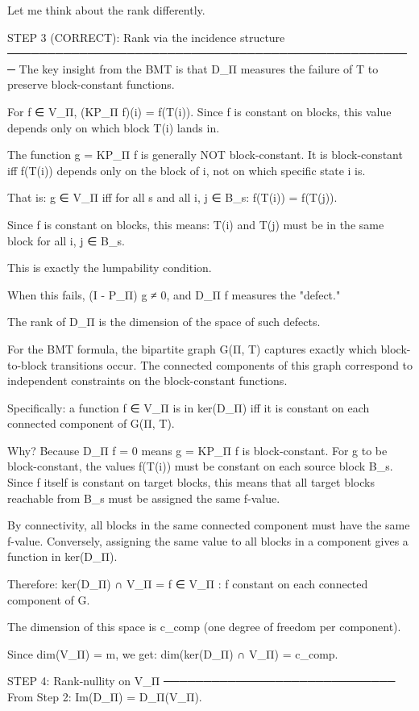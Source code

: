 Let me think about the rank differently.

STEP 3 (CORRECT): Rank via the incidence structure
───────────────────────────────────────────────────
The key insight from the BMT is that D_Π measures the failure of T to
preserve block-constant functions.

For f ∈ V_Π, (KP_Π f)(i) = f(T(i)). Since f is constant on blocks, this
value depends only on which block T(i) lands in.

The function g = KP_Π f is generally NOT block-constant. It is block-constant
iff f(T(i)) depends only on the block of i, not on which specific state i is.

That is: g ∈ V_Π iff for all s and all i, j ∈ B_s:
f(T(i)) = f(T(j)).

Since f is constant on blocks, this means: T(i) and T(j) must be in the
same block for all i, j ∈ B_s.

This is exactly the lumpability condition.

When this fails, (I - P_Π) g ≠ 0, and D_Π f measures the "defect."

The rank of D_Π is the dimension of the space of such defects.

For the BMT formula, the bipartite graph G(Π, T) captures exactly which
block-to-block transitions occur. The connected components of this graph
correspond to independent constraints on the block-constant functions.

Specifically: a function f ∈ V_Π is in ker(D_Π) iff it is constant on
each connected component of G(Π, T).

Why? Because D_Π f = 0 means g = KP_Π f is block-constant.
For g to be block-constant, the values f(T(i)) must be constant on each
source block B_s. Since f itself is constant on target blocks, this means
that all target blocks reachable from B_s must be assigned the same f-value.

By connectivity, all blocks in the same connected component must have the
same f-value. Conversely, assigning the same value to all blocks in a
component gives a function in ker(D_Π).

Therefore:
ker(D_Π) ∩ V_Π = {f ∈ V_Π : f constant on each connected component of G}.

The dimension of this space is c_comp (one degree of freedom per component).

Since dim(V_Π) = m, we get:
dim(ker(D_Π) ∩ V_Π) = c_comp.

STEP 4: Rank-nullity on V_Π
─────────────────────────────
From Step 2: Im(D_Π) = D_Π(V_Π).

